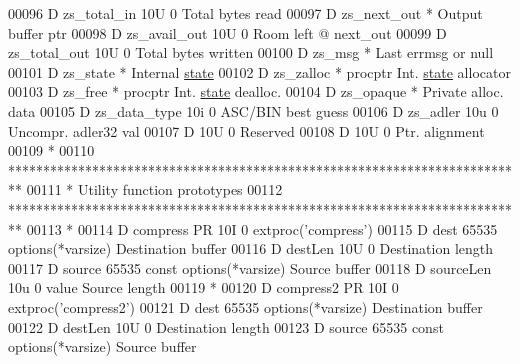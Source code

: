 \begin{DoxyCode}
00096      D  zs\_total\_in                  10U 0                                      Total bytes read
00097      D  zs\_next\_out                    *                                        Output buffer ptr
00098      D  zs\_avail\_out                 10U 0                                      Room left @ next\_out
00099      D  zs\_total\_out                 10U 0                                      Total bytes written
00100      D  zs\_msg                         *                                        Last errmsg or null
00101      D  zs\_state                       *                                        Internal 
      \hyperlink{structstate}{state}
00102      D  zs\_zalloc                      *   procptr                              Int. 
      \hyperlink{structstate}{state} allocator
00103      D  zs\_free                        *   procptr                              Int. 
      \hyperlink{structstate}{state} dealloc.
00104      D  zs\_opaque                      *                                        Private alloc. data
00105      D  zs\_data\_type                 10i 0                                      ASC/BIN best guess
00106      D  zs\_adler                     10u 0                                      Uncompr. adler32 val
00107      D                               10U 0                                      Reserved
00108      D                               10U 0                                      Ptr. alignment
00109       *
00110       **************************************************************************
00111       *                     Utility function prototypes
00112       **************************************************************************
00113       *
00114      D compress        PR            10I 0 extproc('compress')
00115      D  dest                      65535    options(*varsize)                    Destination buffer
00116      D  destLen                      10U 0                                      Destination length
00117      D  source                    65535    const options(*varsize)              Source buffer
00118      D  sourceLen                    10u 0 value                                Source length
00119       *
00120      D compress2       PR            10I 0 extproc('compress2')
00121      D  dest                      65535    options(*varsize)                    Destination buffer
00122      D  destLen                      10U 0                                      Destination length
00123      D  source                    65535    const options(*varsize)              Source buffer

\end{DoxyCode}
